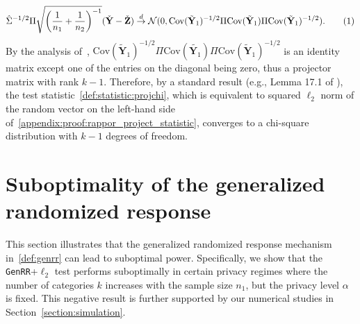 \documentclass[twoside,11pt]{article}
\newcommand\numberthis{\addtocounter{equation}{1}\tag{\theequation}}
\newcommand{\vectorize}[1]{\mathbf{#1}}
\newcommand{\rvY}{Y}
\newcommand{\rVecY}{\vectorize{\rvY}}
\newcommand{\rvZ}{Z}
\newcommand{\rVecZ}{\vectorize{\rvZ}}
\newcommand{\alphabetSize}{k} %
\newcommand{\sampleSize}{n}
\newcommand{\privacyParameter}{\alpha} %
\begin{document}
\begin{appendix}
\begin{align*}
		\hat{\Sigma}^{-1/2} \Pi
		\sqrt{\biggl( \dfrac{1}{\sampleSize_1}+\dfrac{1}{\sampleSize_2} \biggr)^{-1}}
		(
		\check{\rVecY} 
		-
		\check{\rVecZ} 
		)
		\stackrel{d}{
			\to}
		\mathcal{N}(0,
		\mathrm{Cov}(\tilde{\rVecY}_1)^{-1/2} \Pi \mathrm{Cov}(\tilde{\rVecY}_1) \Pi \mathrm{Cov}(\tilde{\rVecY}_1)^{-1/2}).
		\numberthis \label{appendix:proof:rappor_project_statistic}
	\end{align*}
	By the analysis of~\citet{Gaboardi2018LDPChisq},	
	$\mathrm{Cov}(\tilde{\rVecY}_1)^{-1/2} \Pi \mathrm{Cov}(\tilde{\rVecY_1}) \Pi \mathrm{Cov}(\tilde{\rVecY}_1)^{-1/2}$ is an identity matrix except one of the entries on the diagonal being zero, thus a projector matrix with rank $\alphabetSize - 1$.
	Therefore, by a standard result (e.g., Lemma 17.1 of \citet{van_der_vaart_asymptotic_1998}), the test statistic~\eqref{def:statistic:projchi}, which is equivalent to squared $\ell_2$ norm of the random vector on the left-hand side of~\eqref{appendix:proof:rappor_project_statistic}, converges to a chi-square distribution with $\alphabetSize - 1$ degrees of freedom.
	\section{Suboptimality of the generalized randomized response}\label{genrr_suboptimal_theory}
	This section illustrates that  the generalized randomized response mechanism in~\eqref{def:genrr} can lead to suboptimal power. Specifically, we show that the \texttt{GenRR}+$\ell_2$ test performs suboptimally in certain privacy regimes where the number of categories $\alphabetSize$ increases with the sample size $\sampleSize_1$, but the privacy level $\privacyParameter$ is fixed. This negative result is further supported by our numerical studies in Section~\ref{section:simulation}. 
	

\end{appendix}
\end{document}
